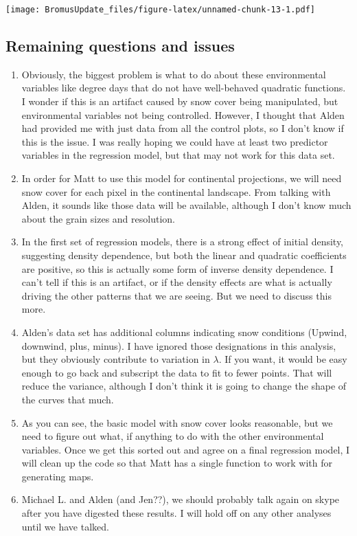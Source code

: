 \documentclass[]{article}
\begin{document}
\texttt{[image: BromusUpdate\_files/figure-latex/unnamed-chunk-13-1.pdf]}

\hypertarget{remaining-questions-and-issues}{%
\subsection{Remaining questions and
issues}\label{remaining-questions-and-issues}}

\begin{enumerate}
\def\labelenumi{\arabic{enumi}.}
\item
  Obviously, the biggest problem is what to do about these environmental
  variables like degree days that do not have well-behaved quadratic
  functions. I wonder if this is an artifact caused by snow cover being
  manipulated, but environmental variables not being controlled.
  However, I thought that Alden had provided me with just data from all
  the control plots, so I don't know if this is the issue. I was really
  hoping we could have at least two predictor variables in the
  regression model, but that may not work for this data set.
\item
  In order for Matt to use this model for continental projections, we
  will need snow cover for each pixel in the continental landscape. From
  talking with Alden, it sounds like those data will be available,
  although I don't know much about the grain sizes and resolution.
\item
  In the first set of regression models, there is a strong effect of
  initial density, suggesting density dependence, but both the linear
  and quadratic coefficients are positive, so this is actually some form
  of inverse density dependence. I can't tell if this is an artifact, or
  if the density effects are what is actually driving the other patterns
  that we are seeing. But we need to discuss this more.
\item
  Alden's data set has additional columns indicating snow conditions
  (Upwind, downwind, plus, minus). I have ignored those designations in
  this analysis, but they obviously contribute to variation in
  \(\lambda\). If you want, it would be easy enough to go back and
  subscript the data to fit to fewer points. That will reduce the
  variance, although I don't think it is going to change the shape of
  the curves that much.
\item
  As you can see, the basic model with snow cover looks reasonable, but
  we need to figure out what, if anything to do with the other
  environmental variables. Once we get this sorted out and agree on a
  final regression model, I will clean up the code so that Matt has a
  single function to work with for generating maps.
\item
  Michael L. and Alden (and Jen??), we should probably talk again on
  skype after you have digested these results. I will hold off on any
  other analyses until we have talked.
\end{enumerate}
\end{document}
